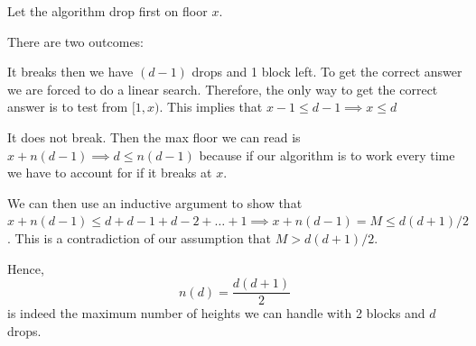 \documentclass[12pt, letterpaper]{article}
\theoremstyle{definition}
\begin{document}
\begin{enumerate}[(a)]
\begin{itemize}
    Let the algorithm drop first on floor $x$.

    There are two outcomes:

    It breaks then we have $(d-1)$ drops and 1 block left. To get the correct answer we are forced to do a linear search. Therefore, the only way to get the correct answer is to test from $[1,x)$. This implies that $x-1 \leq d-1 \implies x \leq d$

    It does not break. Then the max floor we can read is $x+n(d-1) \implies d \leq n(d-1)$ because if our algorithm is to work every time we have to account for if it breaks at $x$.

    We can then use an inductive argument to show that $x+n(d-1) \leq d + d-1 + d-2+\dots+1 \implies x+n(d-1)=M \leq d(d+1)/2$. This is a contradiction of our assumption that $M > d(d+1)/2$.
    \end{itemize}
    
    Hence, 
    \[
    n(d)= \frac{d(d+1)}{2}
    \]
    is indeed the maximum number of heights we can handle with 2 blocks and $d$ drops.
    
\end{enumerate}
\end{document}
